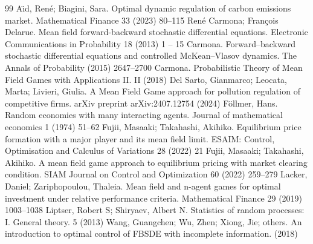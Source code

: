 \documentclass[10pt,a4paper]{amsart}
\numberwithin{equation}{section}
\begin{document}
\begin{thebibliography}{99}
 A{\"\i}d, Ren{\'e}; Biagini, Sara. Optimal dynamic regulation of carbon emissions market. Mathematical Finance 33 (2023) 80--115
 Ren{\'e} Carmona; Fran{\c{c}}ois Delarue. Mean field forward-backward stochastic differential equations. Electronic Communications in Probability 18 (2013) 1 -- 15
 Carmona. Forward--backward stochastic differential equations and controlled McKean--Vlasov dynamics. The Annals of Probability (2015) 2647--2700
 Carmona. Probabilistic Theory of Mean Field Games with Applications II. II (2018)
 Del Sarto, Gianmarco; Leocata, Marta; Livieri, Giulia. A Mean Field Game approach for pollution regulation of competitive firms. arXiv preprint arXiv:2407.12754 (2024)
 F{\"o}llmer, Hans. Random economies with many interacting agents. Journal of mathematical economics 1 (1974) 51--62
 Fujii, Masaaki; Takahashi, Akihiko. Equilibrium price formation with a major player and its mean field limit. ESAIM: Control, Optimisation and Calculus of Variations 28 (2022) 21
 Fujii, Masaaki; Takahashi, Akihiko. A mean field game approach to equilibrium pricing with market clearing condition. SIAM Journal on Control and Optimization 60 (2022) 259--279
 Lacker, Daniel; Zariphopoulou, Thaleia. Mean field and n-agent games for optimal investment under relative performance criteria. Mathematical Finance 29 (2019) 1003--1038
 Liptser, Robert S; Shiryaev, Albert N. Statistics of random processes: I. General theory. 5 (2013)
 Wang, Guangchen; Wu, Zhen; Xiong, Jie; others. An introduction to optimal control of FBSDE with incomplete information. (2018)
\end{thebibliography}
\end{document}
